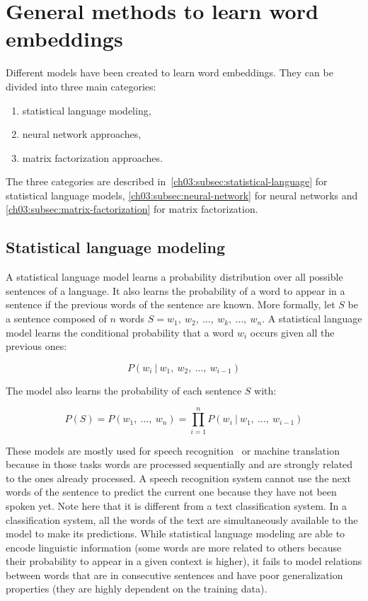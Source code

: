 \section{General methods to learn word embeddings}
  Different models have been created to learn word embeddings. They can be
  divided into three main categories:
  \begin{enumerate}
    \item statistical language modeling,
    \item neural network approaches,
    \item matrix factorization approaches.
  \end{enumerate}

  \noindent The three categories are described
  in~\autoref{ch03:subsec:statistical-language} for statistical language models,
  \autoref{ch03:subsec:neural-network} for neural networks and
  \autoref{ch03:subsec:matrix-factorization} for matrix factorization.

  \subsection{Statistical language modeling}
    \label{ch03:subsec:statistical-language}
    A statistical language model learns a probability distribution over all
    possible sentences of a language. It also learns the probability of a word
    to appear in a sentence if the previous words of the sentence are known.
    More formally, let $S$ be a sentence composed of $n$ words $S =
    w_1,~w_2,~\dots, ~w_k,~\dots, ~w_n$. A statistical language model learns the
    conditional probability that a word $w_i$ occurs given all the previous
    ones:

    \begin{equation}
      P(w_i~|~w_1,~w_2,~\dots,~w_{i-1})
    \end{equation}

    \noindent The model also learns the probability of each sentence $S$ with:

    \begin{equation}
      P(S) = P(w_1,~\dots,~w_n)
            = \prod_{i = 1}^n P(w_i~|~w_1,~\dots,~w_{i-1})
    \end{equation}

    \noindent These models are mostly used for speech
    recognition~\citep{bahl1989tree} or machine
    translation~\citep{brown1990statistical} because in those tasks words are
    processed sequentially and are strongly related to the ones already
    processed. A speech recognition system cannot use the next words of the
    sentence to predict the current one because they have not been spoken yet.
    Note here that it is different from a text classification system. In a
    classification system, all the words of the text are simultaneously
    available to the model to make its predictions.
    While statistical language modeling are able to encode linguistic
    information (some words are more related to others because their probability
    to appear in a given context is higher), it fails to model relations between
    words that are in consecutive sentences and have poor generalization
    properties (they are highly dependent on the training data).

